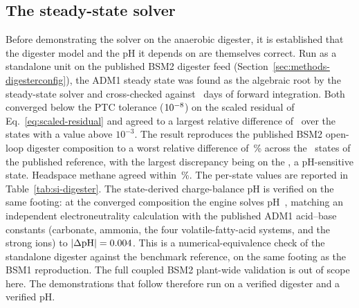 \documentclass{article}
\begin{document}
\subsection{The steady-state solver}
\label{sec:results-steadysolver}

Before demonstrating the solver on the anaerobic digester, it is established that the digester model and the pH it depends on are themselves correct. Run as a standalone unit on the published BSM2 digester feed (Section~\ref{sec:methods-digesterconfig}), the ADM1 steady state was found as the algebraic root by the steady-state solver and cross-checked against \SteadyFwdHorizon~days of forward integration. Both converged below the PTC tolerance (\(10^{-8}\)) on the scaled residual of Eq.~\eqref{eq:scaled-residual} and agreed to a largest relative difference of \DigPtcVsFwd\ over the states with a value above \(10^{-3}\). The result reproduces the published BSM2 open-loop digester composition to a worst relative difference of \DigWorstPct\,\% across the \DigNstates\ states of the published reference, with the largest discrepancy being on the \DigWorstName, a pH-sensitive state. Headspace methane agreed within \DigMethanePct\,\%. The per-state values are reported in Table~\ref{tab:si-digester}. The state-derived charge-balance pH is verified on the same footing: at the converged composition the engine solves pH~\DigPH, matching an independent electroneutrality calculation with the published ADM1 acid--base constants (carbonate, ammonia, the four volatile-fatty-acid systems, and the strong ions) to \(\lvert\Delta\text{pH}\rvert=0.004\). This is a numerical-equivalence check of the standalone digester against the benchmark reference, on the same footing as the BSM1 reproduction. The full coupled BSM2 plant-wide validation is out of scope here. The demonstrations that follow therefore run on a verified digester and a verified pH.
\end{document}
